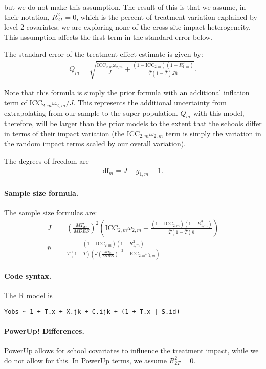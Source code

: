 \documentclass[12pt]{article}
\begin{document}
but we do not make this assumption.
The result of this is that we assume, in their notation, $R_{2T}^2=0$, which is the percent of treatment variation explained by level 2 covariates; we are exploring none of the cross-site impact heterogeneity.
This assumption affects the first term in the standard error below.

The standard error of the treatment effect estimate is given by:
\begin{align}Q_m = \sqrt{\frac{\text{ICC}_{2,m} \omega_{2,m}}{J} + \frac{(1-\text{ICC}_{2,m})(1-R^2_{1,m})}{\bar{T}(1 - \bar{T}) J \bar{n}}}.\end{align}

Note that this formula is simply the prior formula with an additional inflation term of $\text{ICC}_{2,m} \omega_{2,m} / J$.
This represents the additional uncertainty from extrapolating from our sample to the super-population.
$Q_m$ with this model, therefore, will be larger than the prior models to the extent that the schools differ in terms of their impact variation (the $\text{ICC}_{2,m} \omega_{2,m}$ term is simply the variation in the random impact terms scaled by our overall variation).

The degrees of freedom are
\begin{align}\text{df}_m = J - g_{1,m} - 1.\end{align}

\paragraph{Sample size formula.} 
The sample size formulas are:
\begin{align}
J &= \left(\frac{MT_{df}}{MDES}\right)^2 \left(\text{ICC}_{2,m} \omega_{2,m} + \frac{(1-\text{ICC}_{2,m})(1-R^2_{1,m})}{\bar{T}(1 - \bar{T}) \bar{n}} \right)\\
\bar{n} &= \frac{(1-\text{ICC}_{2,m})(1-R^2_{1,m})}{\bar{T}(1 - \bar{T})\left(J \left(\frac{MT_{df}}{MDES}\right)^{-2} - \text{ICC}_{2,m} \omega_{2,m}\right)}
\end{align}

\paragraph{Code syntax.}
The R model is
\begin{verbatim}
Yobs ~ 1 + T.x + X.jk + C.ijk + (1 + T.x | S.id)
\end{verbatim}

\paragraph{PowerUp! Differences.}
PowerUp allows for school covariates to influence the treatment impact, while we do not allow for this. In PowerUp terms, we assume $R^2_{2T} = 0$.
\end{document}
